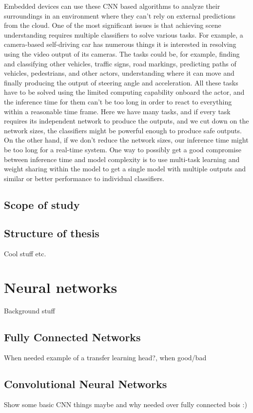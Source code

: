 Embedded devices can use these CNN based algorithms to analyze their surroundings in an environment where they can't rely on external predictions from the cloud. One of the most significant issues is that achieving scene understanding requires multiple classifiers to solve various tasks. For example, a camera-based self-driving car has numerous things it is interested in resolving using the video output of its cameras. The tasks could be, for example, finding and classifying other vehicles, traffic signs, road markings, predicting paths of vehicles, pedestrians, and other actors, understanding where it can move and finally producing the output of steering angle and acceleration. All these tasks have to be solved using the limited computing capability onboard the actor, and the inference time for them can't be too long in order to react to everything within a reasonable time frame. Here we have many tasks, and if every task requires its independent network to produce the outputs, and we cut down on the network sizes, the classifiers might be powerful enough to produce safe outputs. On the other hand, if we don't reduce the network sizes, our inference time might be too long for a real-time system. One way to possibly get a good compromise between inference time and model complexity is to use multi-task learning and weight sharing within the model to get a single model with multiple outputs and similar or better performance to individual classifiers.



\section{Scope of study}

\section{Structure of thesis}
Cool stuff etc.

\chapter{Neural networks}
Background stuff 
\section{Fully Connected Networks}
When needed example of a transfer learning head?, when good/bad
\section{Convolutional Neural Networks}
Show some basic CNN things maybe and why needed over fully connected bois :) 
